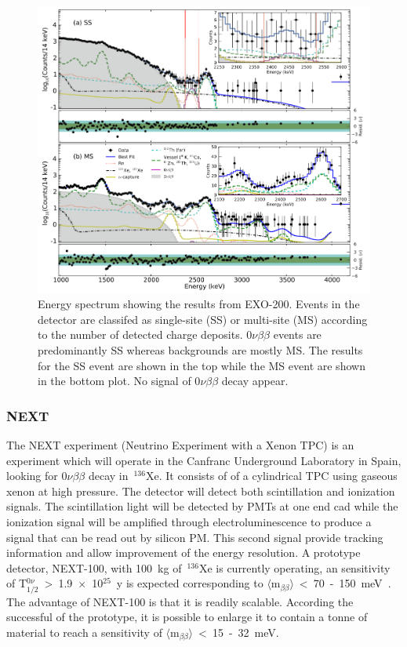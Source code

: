 \documentclass[main.tex]{subfiles}
\begin{document}
\begin{figure}[h!]
\begin{center}
\includegraphics[scale=0.4]{pictures/Chap2/EXO-200-experiment.png}
\caption{Energy spectrum showing the results from EXO-200. Events in the detector are classifed as single-site (SS) or multi-site (MS) according to the number of detected charge deposits. 0$\nu\beta\beta$ events are predominantly SS whereas backgrounds are mostly MS. The results for the SS event are shown in the top while the MS event are shown in the bottom plot. No signal of 0$\nu\beta\beta$ decay appear.}
\label{EXO200results}
\end{center}
\end{figure}


\FloatBarrier


\subsubsection{NEXT}


\NI The NEXT experiment (Neutrino Experiment with a Xenon TPC) is an experiment which will operate in the Canfranc Underground Laboratory in Spain, looking for 0$\nu\beta\beta$ decay in~$^{\text{136}}$Xe. It consists of of a cylindrical TPC using gaseous xenon at high pressure. The detector will detect both scintillation and ionization signals. The scintillation light will be detected by PMTs at one end cad while the ionization signal will be amplified through electroluminescence to produce a signal that can be read out by silicon PM. This second signal provide tracking information and allow improvement of the energy resolution. A prototype detector, NEXT-100, with 100~kg of~$^{\text{136}}$Xe is currently operating, an sensitivity of T$_{\text{1/2}}^{0\nu}$~>~1.9~$\times$~10$^{\text{25}}$~y is expected corresponding to $\langle \text{m}_{\beta\beta} \rangle$~<~70~-~150~meV~\cite{NEXT}. The advantage of NEXT-100 is that it is readily scalable. According the successful of the prototype, it is possible to enlarge it to contain a tonne of material to reach a sensitivity of $\langle \text{m}_{\beta\beta} \rangle$~<~15~-~32~meV.
\end{document}
